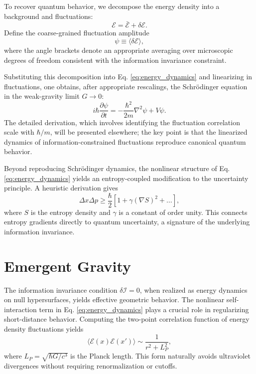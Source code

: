\documentclass[prd,10pt,twocolumn]{revtex4-2}
\newcommand{\cE}{\mathcal{E}}
\newcommand{\cI}{\mathcal{I}}
\begin{document}
To recover quantum behavior, we decompose the energy density into a background and fluctuations:
\begin{equation}
\cE = \bar{\cE} + \delta \cE. \label{eq:decomposition}
\end{equation}
Define the coarse-grained fluctuation amplitude
\begin{equation}
\psi \equiv \langle \delta \cE \rangle, \label{eq:psi_def}
\end{equation}
where the angle brackets denote an appropriate averaging over microscopic degrees of freedom consistent with the information invariance constraint.

Substituting this decomposition into Eq. \eqref{eq:energy_dynamics} and linearizing in fluctuations, one obtains, after appropriate rescalings, the Schr\"odinger equation in the weak-gravity limit $G \to 0$:
\begin{equation}
i\hbar \frac{\partial \psi}{\partial t} = -\frac{\hbar^2}{2m}\nabla^2 \psi + V \psi. \label{eq:schrodinger}
\end{equation}
The detailed derivation, which involves identifying the fluctuation correlation scale with $\hbar/m$, will be presented elsewhere; the key point is that the linearized dynamics of information-constrained fluctuations reproduce canonical quantum behavior.

Beyond reproducing Schr\"odinger dynamics, the nonlinear structure of Eq. \eqref{eq:energy_dynamics} yields an entropy-coupled modification to the uncertainty principle. A heuristic derivation gives
\begin{equation}
\Delta x \Delta p \geq \frac{\hbar}{2}\left[1 + \gamma (\nabla S)^2 + \dots \right], \label{eq:gup}
\end{equation}
where $S$ is the entropy density and $\gamma$ is a constant of order unity. This connects entropy gradients directly to quantum uncertainty, a signature of the underlying information invariance.

\section{Emergent Gravity}
\label{sec:gravity}

The information invariance condition $\delta \cI = 0$, when realized as energy dynamics on null hypersurfaces, yields effective geometric behavior. The nonlinear self-interaction term in Eq. \eqref{eq:energy_dynamics} plays a crucial role in regularizing short-distance behavior. Computing the two-point correlation function of energy density fluctuations yields
\begin{equation}
\langle \cE(x)\cE(x') \rangle \sim \frac{1}{r^2 + L_P^2}, \label{eq:correlations}
\end{equation}
where $L_P = \sqrt{\hbar G/c^3}$ is the Planck length. This form naturally avoids ultraviolet divergences without requiring renormalization or cutoffs.
\end{document}
